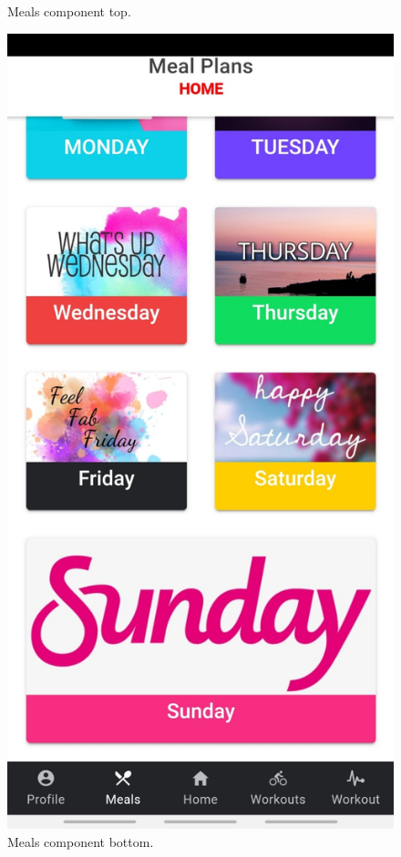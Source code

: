 \documentclass[a4paper,12pt]{report}
\begin{document}
\begin{figure}[ht]
\begin{minipage}[b]{0.5\linewidth}
    \caption{Meals component top.} 
    \vspace{4ex}
  \end{minipage} 
  \begin{minipage}[b]{0.5\linewidth}
    \centering
    \includegraphics[width=.7\linewidth]{images/aplicationImages/mealsBottom.jpeg} 
    \caption{Meals component bottom.} 
    \vspace{4ex}
  \end{minipage}%
  \begin{minipage}[b]{0.5\linewidth}
    \centering

\end{minipage}
\end{figure}
\end{document}
